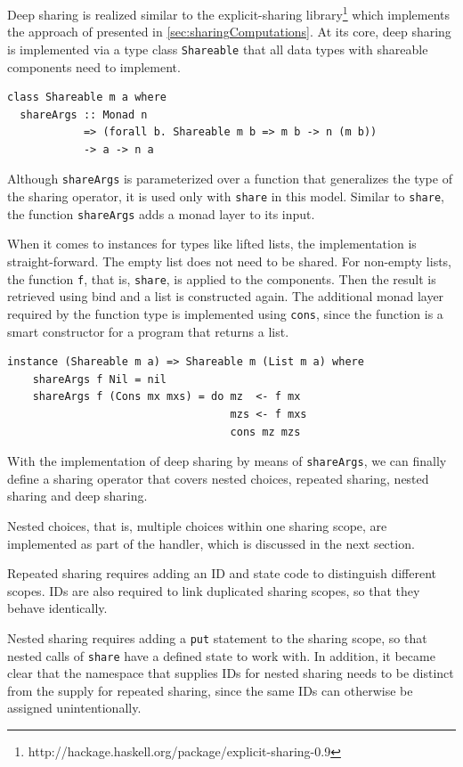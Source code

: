\documentclass[a4paper, 11pt, fleqn, twoside]{scrreprt}
\newcommand{\hinl}[1]{\texttt{#1}}
\begin{document}
Deep sharing is realized similar to the explicit-sharing library\footnote{http://hackage.haskell.org/package/explicit-sharing-0.9} which implements the approach of \citep{fischer2009purely} presented in \autoref{sec:sharingComputations}.
At its core, deep sharing is implemented via a type class \hinl{Shareable} that all data types with shareable components need to implement.

\begin{verbatim}
class Shareable m a where
  shareArgs :: Monad n 
            => (forall b. Shareable m b => m b -> n (m b))
            -> a -> n a
\end{verbatim}

Although \hinl{shareArgs} is parameterized over a function that generalizes the type of the sharing operator, it is used only with \hinl{share} in this model.
Similar to \hinl{share}, the function \hinl{shareArgs} adds a monad layer to its input.

When it comes to instances for types like lifted lists, the implementation is straight-forward.
The empty list does not need to be shared.
For non-empty lists, the function \hinl{f}, that is, \hinl{share}, is applied to the components.
Then the result is retrieved using bind and a list is constructed again.
The additional monad layer required by the function type is implemented using \hinl{cons}, since the function is a smart constructor for a program that returns a list.

\begin{verbatim}
instance (Shareable m a) => Shareable m (List m a) where
    shareArgs f Nil = nil
    shareArgs f (Cons mx mxs) = do mz  <- f mx
                                   mzs <- f mxs
                                   cons mz mzs
\end{verbatim}

With the implementation of deep sharing by means of \hinl{shareArgs}, we can finally define a sharing operator that covers nested choices, repeated sharing, nested sharing and deep sharing.

Nested choices, that is, multiple choices within one sharing scope, are implemented as part of the handler, which is discussed in the next section.

Repeated sharing requires adding an ID and state code to distinguish different scopes.
IDs are also required to link duplicated sharing scopes, so that they behave identically.

Nested sharing requires adding a \hinl{put} statement to the sharing scope, so that nested calls of \hinl{share} have a defined state to work with.
In addition, it became clear that the namespace that supplies IDs for nested sharing needs to be distinct from the supply for repeated sharing, since the same IDs can otherwise be assigned unintentionally.
\end{document}
